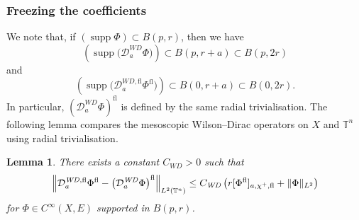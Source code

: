 \documentclass[a4paper,oneside,12pt]{amsart}
\theoremstyle{plain}
\newtheorem{lemma}[theorem]{Lemma}
\theoremstyle{definition}
\theoremstyle{remark}
\DeclarePairedDelimiter{\norm}{\lVert}{\rVert}
\DeclarePairedDelimiter{\seminorm}{\lbrack}{\rbrack}
\DeclareMathOperator{\support}{supp}
\newcommand{\flattorus}{\mathbb{T}^n}
\newcommand{\Ltwonorm}[2][L^2]{\norm{#2}_{#1}}
\newcommand{\flatmesoscopicdifferenceseminorm}[3][a]{\seminorm{#3}_{#1,#2,\mathrm{fl}}}
\newcommand{\mesoscopicWilsonDiracoperator}[1][a]{\mathcal{D}_{#1}^{\mathit{WD}}}
\newcommand{\cutoffupper}{\chi^+}
\newcommand{\flatmesoscopicWilsonDiracoperator}[1][a]{\mathcal{D}_{#1}^{\mathit{WD},\mathrm{fl}}}
\newcommand{\flatmodel}[1]{#1^{\mathrm{fl}}}
\newcommand{\constantWD}{C_{\mathit{WD}}}
\begin{document}
\subsubsection{Freezing the coefficients}

We note that, if $(\support \Phi) \subset B(p,r)$, then we have
\begin{equation}
  \left( \support \big(\mesoscopicWilsonDiracoperator \Phi\big) \right) \subset B(p,r+a) \subset B(p,2r)
\end{equation}
and
\begin{equation}
  \left( \support \big(\flatmesoscopicWilsonDiracoperator \flatmodel{\Phi}\big) \right) \subset B(0,r+a) \subset B(0,2r).
\end{equation}
In particular, $\flatmodel{\left(\mesoscopicWilsonDiracoperator \Phi\right)}$ is defined by the same radial trivialisation.
The following lemma compares the mesoscopic Wilson--Dirac operators on $X$ and $\flattorus$ using radial trivialisation.
\begin{lemma}\label{lemma: comparison of two freezing operators}
  There exists a constant $\constantWD > 0$ such that
  \begin{equation}
    \norm*{\flatmesoscopicWilsonDiracoperator \flatmodel{\Phi} - \flatmodel{\left(\mesoscopicWilsonDiracoperator \Phi\right)}}_{L^2(\flattorus)} \le \constantWD \left( r\flatmesoscopicdifferenceseminorm{\cutoffupper}{\flatmodel{\Phi}} + \Ltwonorm{\Phi} \right)
  \end{equation}
  for $\Phi \in C^{\infty}(X,E)$ supported in $B(p,r)$.
\end{lemma}
\end{document}
